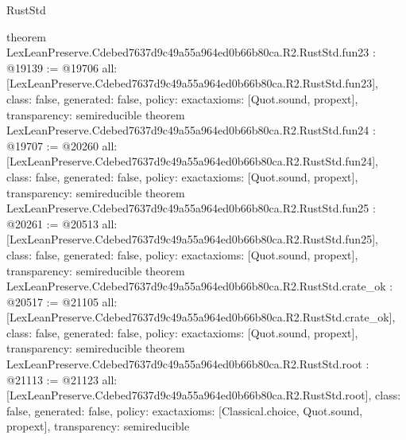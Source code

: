 \begin{lexlean}{RustStd}
\begin{coremodule}
{}
theorem LexLeanPreserve.Cdebed7637d9c49a55a964ed0b66b80ca.R2.RustStd.fun23 : @19139 := @19706 {
  all: [LexLeanPreserve.Cdebed7637d9c49a55a964ed0b66b80ca.R2.RustStd.fun23],
  class: false,
  generated: false,
  policy: exact{axioms: [Quot.sound, propext]},
  transparency: semireducible
}
theorem LexLeanPreserve.Cdebed7637d9c49a55a964ed0b66b80ca.R2.RustStd.fun24 : @19707 := @20260 {
  all: [LexLeanPreserve.Cdebed7637d9c49a55a964ed0b66b80ca.R2.RustStd.fun24],
  class: false,
  generated: false,
  policy: exact{axioms: [Quot.sound, propext]},
  transparency: semireducible
}
theorem LexLeanPreserve.Cdebed7637d9c49a55a964ed0b66b80ca.R2.RustStd.fun25 : @20261 := @20513 {
  all: [LexLeanPreserve.Cdebed7637d9c49a55a964ed0b66b80ca.R2.RustStd.fun25],
  class: false,
  generated: false,
  policy: exact{axioms: [Quot.sound, propext]},
  transparency: semireducible
}
theorem LexLeanPreserve.Cdebed7637d9c49a55a964ed0b66b80ca.R2.RustStd.crate_ok : @20517 := @21105 {
  all: [LexLeanPreserve.Cdebed7637d9c49a55a964ed0b66b80ca.R2.RustStd.crate_ok],
  class: false,
  generated: false,
  policy: exact{axioms: [Quot.sound, propext]},
  transparency: semireducible
}
theorem LexLeanPreserve.Cdebed7637d9c49a55a964ed0b66b80ca.R2.RustStd.root : @21113 := @21123 {
  all: [LexLeanPreserve.Cdebed7637d9c49a55a964ed0b66b80ca.R2.RustStd.root],
  class: false,
  generated: false,
  policy: exact{axioms: [Classical.choice, Quot.sound, propext]},
  transparency: semireducible
}


\end{coremodule}
\end{lexlean}
